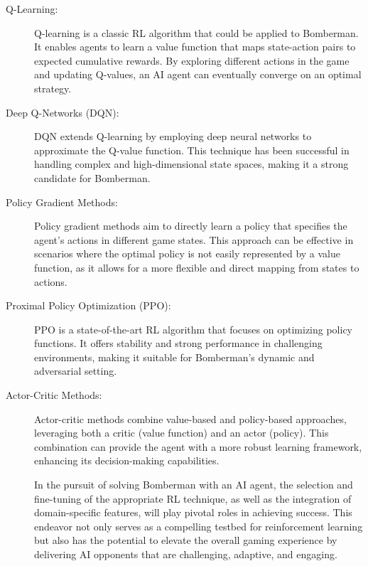 \begin{description}
\item[Q-Learning:] Q-learning is a classic RL algorithm that could be applied to Bomberman. 
It enables agents to learn a value function that maps state-action pairs to expected 
cumulative rewards. By exploring different actions in the game and updating Q-values, 
an AI agent can eventually converge on an optimal strategy.

\item[Deep Q-Networks (DQN):] DQN extends Q-learning by employing deep neural networks 
to approximate the Q-value function. This technique has been successful in handling 
complex and high-dimensional state spaces, making it a strong candidate for Bomberman.

\item[Policy Gradient Methods:] Policy gradient methods aim to directly learn a policy 
that specifies the agent's actions in different game states. This approach can be 
effective in scenarios where the optimal policy is not easily represented by a value function, 
as it allows for a more flexible and direct mapping from states to actions.

\item[Proximal Policy Optimization (PPO):] PPO is a state-of-the-art RL algorithm that focuses 
on optimizing policy functions. It offers stability and strong performance in challenging 
environments, making it suitable for Bomberman's dynamic and adversarial setting.

\item[Actor-Critic Methods:] Actor-critic methods combine value-based and policy-based approaches, 
leveraging both a critic (value function) and an actor (policy). This combination can provide the 
agent with a more robust learning framework, enhancing its decision-making capabilities.

In the pursuit of solving Bomberman with an AI agent, the selection and fine-tuning 
of the appropriate RL technique, as well as the integration of domain-specific features, will 
play pivotal roles in achieving success. This endeavor not only serves as a compelling testbed for 
reinforcement learning but also has the potential to elevate the overall gaming experience 
by delivering AI opponents that are challenging, adaptive, and engaging.
\end{description}